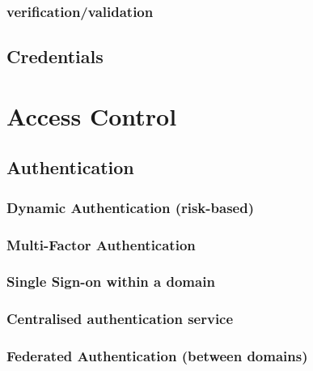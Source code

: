 \hypertarget{verificationvalidation}{%
\subsection{verification/validation}\label{verificationvalidation}}

\hypertarget{credentials}{%
\section{Credentials}\label{credentials}}

\hypertarget{access-control}{%
\chapter{Access Control}\label{access-control}}

\hypertarget{authentication}{%
\section{Authentication}\label{authentication}}

\hypertarget{dynamic-authentication-risk-based}{%
\subsection{Dynamic Authentication
(risk-based)}\label{dynamic-authentication-risk-based}}

\hypertarget{multi-factor-authentication}{%
\subsection{Multi-Factor
Authentication}\label{multi-factor-authentication}}

\hypertarget{single-sign-on-within-a-domain}{%
\subsection{Single Sign-on within a
domain}\label{single-sign-on-within-a-domain}}

\hypertarget{centralised-authentication-service}{%
\subsection{Centralised authentication
service}\label{centralised-authentication-service}}

\hypertarget{federated-authentication-between-domains}{%
\subsection{Federated Authentication (between
domains)}\label{federated-authentication-between-domains}}

